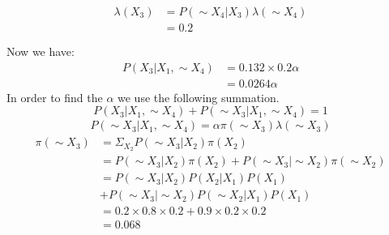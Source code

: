 \documentclass[12pt]{article}
\begin{document}
\begin{equation}
	\begin{aligned}
		\lambda (X_3) &= P(\sim X_4 | X_3)\lambda(\sim X_4) \\
		&= 0.2 \\ \\
	\end{aligned}
\end{equation}
Now we have:
\begin{equation}
	\begin{aligned}
		P(X_3 | X_1, \sim X_4) &=0.132 \times 0.2 \alpha \\
		&= 0.0264 \alpha
	\end{aligned}
\end{equation}
In order to find the $\alpha$ we use the following summation.
\begin{equation}
		P(X_3 | X_1, \sim X_4) + 	P(\sim X_3 | X_1, \sim X_4) = 1
\end{equation}
\begin{equation}
	\begin{aligned}
		P(\sim X_3 | X_1, \sim X_4) = \alpha \pi (\sim X_3) \lambda (\sim X_3)
	\end{aligned}
\end{equation}
\begin{equation}
	\begin{aligned}
		\pi (\sim X_3) &= \Sigma_{X_2} P(\sim X_3 | X_2) \pi(X_2)\\
		&=P(\sim X_3 | X_2)\pi(X_2) + P(\sim X_3 | \sim X_2)\pi(\sim X_2)\\
		&=P(\sim X_3 | X_2)P(X_2 | X_1)P(X_1) \\
		&+ P(\sim X_3 | \sim X_2)P(\sim X_2 | X_1)P(X_1) \\
		&= 0.2 \times 0.8 \times 0.2 + 0.9 \times 0.2 \times 0.2 \\
		&= 0.068
	\end{aligned}
\end{equation}
\end{document}
